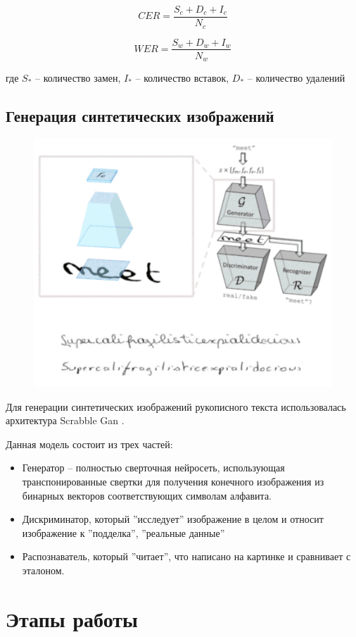 \documentclass[12pt]{article}
\begin{document}
\newpage


$$CER = \frac{S_c + D_c + I_c}{N_c}$$

$$WER = \frac{S_w + D_w + I_w}{N_w}$$

где $S_{*}$ -- количество замен, $I_{*}$ -- количество вставок, $D_{*}$ -- количество удалений


\subsection{Генерация синтетических изображений}

\begin{figure}[htb]
    \centering
    \includegraphics[width=0.6\linewidth]{scrabble_gan.png}
    \label{fig:gan}
\end{figure}


Для генерации синтетических изображений рукописного текста использовалась архитектура Scrabble Gan \cite{scrabble_gan}.

\vspace{10pt}
Данная модель состоит из трех частей:
\begin{itemize}
    \item Генератор -- полностью сверточная нейросеть, использующая  транспонированные свертки для получения конечного изображения
    из  бинарных векторов соответствующих символам алфавита.
    \item Дискриминатор, который ''исследует'' изображение в целом и относит  изображение к ''подделка'', ''реальные данные''
    \item Распознаватель, который ''читает'', что написано на картинке и сравнивает с эталоном.
\end{itemize}

\section{Этапы работы}
\end{document}
